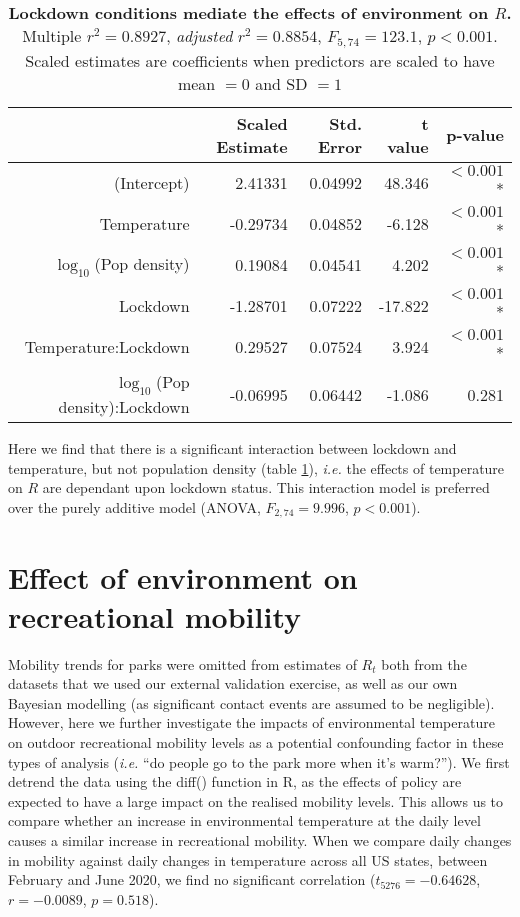 \documentclass[12pt,english,a4paper]{article}
\begin{document}
\begin{table}[ht]
\centering
\caption{{\bf Lockdown conditions mediate the effects of environment on $R$.} Multiple $r^2 = 0.8927$, \textsl{adjusted} $r^2 = 0.8854$, $F_{5,74} = 123.1$, $p < 0.001$. Scaled estimates are coefficients when predictors are scaled to have mean $= 0$ and SD $= 1$}
\begin{tabular}{rrrrr}
  \hline
 & Scaled Estimate & Std. Error & t value & p-value \\ 
  \hline
  (Intercept) & 2.41331 & 0.04992 & 48.346 & $< 0.001$* \\ 
  Temperature & -0.29734 & 0.04852 & -6.128 & $< 0.001$* \\ 
  $\log_{10}$(Pop density) & 0.19084 & 0.04541 & 4.202 & $< 0.001$* \\ 
  Lockdown & -1.28701 & 0.07222 & -17.822 & $< 0.001$* \\ 
  Temperature:Lockdown & 0.29527 & 0.07524 & 3.924 & $< 0.001$* \\ 
  $\log_{10}$(Pop density):Lockdown & -0.06995 & 0.06442 & -1.086 & 0.281  \\ 
   \hline
\end{tabular}
\label{tab:interaction_model}
\end{table}

Here we find that there is a significant interaction between lockdown and temperature, but not population density (table \ref{tab:interaction_model}), \emph{i.e.} the effects of temperature on $R$ are dependant upon lockdown status. This interaction model is preferred over the purely additive model (ANOVA, $F_{2,74} = 9.996$, $p < 0.001$).



\section{Effect of environment on recreational mobility}

Mobility trends for parks were omitted from estimates of $R_t$ both from the datasets that we used our external validation exercise, as well as our own Bayesian modelling (as significant contact events are assumed to be negligible). However, here we further investigate the impacts of environmental temperature on outdoor recreational mobility levels as a potential confounding factor in these types of analysis (\emph{i.e.} ``do people go to the park more when it's warm?''). 
We first detrend the data using the diff() function in R, as the effects of policy are expected to have a large impact on the realised mobility levels. This allows us to compare whether an increase in environmental temperature at the daily level causes a similar increase in recreational mobility. When we compare daily changes in mobility against daily changes in temperature across all US states, between February and June 2020, we find no significant correlation ($t_{5276} = -0.64628$, $r = -0.0089$, $p = 0.518$). 
\end{document}
